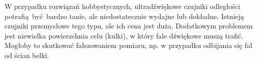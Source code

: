 W przypadku rozwiązań hobbystycznych, ultradźwiękowe czujniki odległości potrafią być bardzo tanie, ale niedostatecznie wydajne lub dokładne. Istnieją czujniki przemysłowe tego typu, ale ich cena jest duża. Dodatkowym problemem jest niewielka powierzchnia celu (kulki), w który fale dźwiękowe muszą trafić. Mogłoby to skutkować fałszowaniem pomiaru, np. w przypadku odbijania się fal od ścian belki.

%
